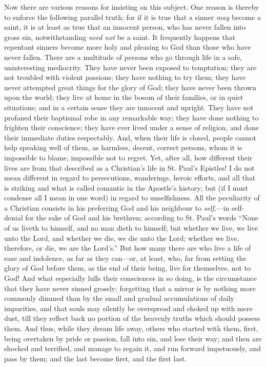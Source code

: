 Now there are various reasons for insisting on this subject. One
reason is thereby to enforce the following parallel truth; for if it
is true that a sinner \emph{may} become a saint, it is at least as
true that an innocent person, who has never fallen into gross sin,
notwithstanding \emph{need not} be a saint. It frequently happens that
repentant sinners become more holy and pleasing to God than those who
have never fallen. There are a multitude of persons who go through
life in a safe, uninteresting mediocrity. They have never been exposed
to temptation; they are not troubled with violent passions; they have
nothing to try them; they have never attempted great things for the
glory of God; they have never been thrown upon the world; they live at
home in the bosom of their families, or in quiet situations; and in a
certain sense they are innocent and upright. They have not profaned
their baptismal robe in any remarkable way; they have done nothing to
frighten their conscience; they have ever lived under a sense of
religion, and done their immediate duties respectably. And, when their
life is closed, people cannot help speaking well of them, as harmless,
decent, correct persons, whom it is impossible to blame, impossible
not to regret. Yet, after all, how different their lives are from that
described as a Christian's life in St. Paul's Epistles! I do not mean
different in regard to persecutions, wanderings, heroic efforts, and
all that is striking and what is called romantic in the Apostle's
history; but (if I must condense all I mean in one word) in regard to
unselfishness. All the peculiarity of a Christian consists in his
preferring God and his neighbour to \emph{self},—in self-denial for
the sake of God and his brethren; according to St. Paul's words
``None of us liveth to himself, and no man dieth to himself; but
whether we live, we live unto the Lord, and whether we die, we die
unto the Lord; whether we live, therefore, or die, we are the
Lord's.'' But how many there are who live a life of ease and
indolence, as far as they can—or, at least, who, far from setting
the glory of God before them, as the end of their being, live for
themselves, not to God! And what especially lulls their consciences in
so doing, is the circumstance that they have never sinned grossly;
forgetting that a mirror is by nothing more commonly dimmed than by
the small and gradual accumulations of daily impurities, and that
souls may silently be overspread and choked up with mere dust, till
they reflect back no portion of the heavenly truths which should
possess them. And thus, while they dream life away, others who started
with them, first, being overtaken by pride or passion, fall into sin,
and lose their way; and then are shocked and terrified, and manage to
regain it, and run forward impetuously, and pass by them; and the last
become first, and the first last.

